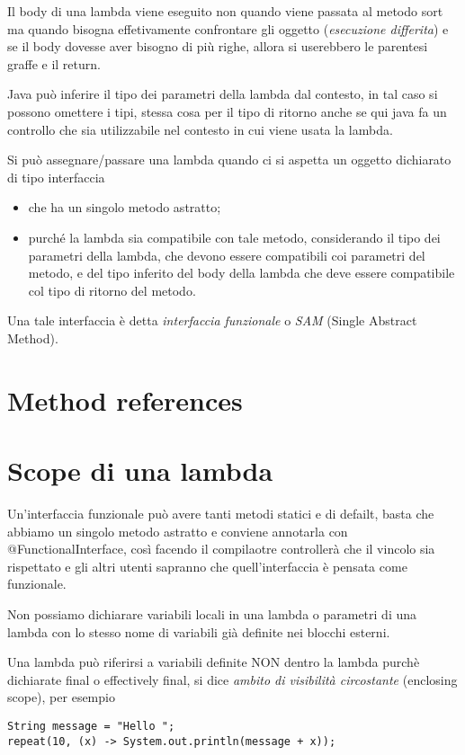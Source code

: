 Il body di una lambda viene eseguito non quando viene passata al metodo sort ma quando bisogna effetivamente confrontare gli oggetto (\textit{esecuzione differita}) e se il body 
dovesse aver bisogno di più righe, allora si userebbero le parentesi graffe e il return.

Java può inferire il tipo dei parametri della lambda dal contesto, in tal caso si possono omettere i tipi, stessa cosa per il tipo di ritorno anche se qui java fa un 
controllo che sia utilizzabile nel contesto in cui viene usata la lambda.

Si può assegnare/passare una lambda quando ci si aspetta un oggetto dichiarato di tipo interfaccia
\begin{itemize}
    \item che ha un singolo metodo astratto;
    \item purché la lambda sia compatibile con tale metodo, considerando il tipo dei parametri della lambda, che devono essere compatibili coi parametri del metodo, 
    e del tipo inferito del body della lambda che deve essere compatibile col tipo di ritorno del metodo.
\end{itemize}

Una tale interfaccia è detta \textit{interfaccia funzionale} o \textit{SAM} (Single Abstract Method).

\section{Method references}


\section{Scope di una lambda}
Un'interfaccia funzionale può avere tanti metodi statici e di defailt, basta che abbiamo un singolo metodo astratto e conviene annotarla con @FunctionalInterface, così
facendo il compilaotre controllerà che il vincolo sia rispettato e gli altri utenti sapranno che quell'interfaccia è pensata come funzionale.

Non possiamo dichiarare variabili locali in una lambda o parametri di una lambda con lo stesso nome di variabili già definite nei blocchi esterni. 

Una lambda può riferirsi a variabili definite NON dentro la lambda purchè dichiarate final o effectively final, si dice \textit{ambito di visibilità circostante} 
(enclosing scope), per esempio
\begin{lstlisting}
String message = "Hello ";
repeat(10, (x) -> System.out.println(message + x));
\end{lstlisting}


